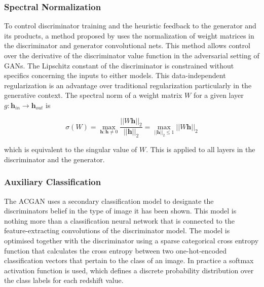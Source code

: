 \documentclass[twocolumn]{article}
\numberwithin{equation}{section}
\begin{document}
\subsubsection{Spectral Normalization}
To control discriminator training and the heuristic feedback to the generator and its products, a method proposed by 
\cite{spectral_norm} uses the normalization of weight matrices in the discriminator and generator convolutional nets. This 
method allows control over the derivative of the discriminator value function in the adversarial setting of GANs. The 
Lipschitz constant of the discriminator is constrained without specifics concerning the inputs to either models. This 
data-independent regularization is an advantage over traditional regularization particularly in the generative context. 
The spectral norm of a weight matrix $W$ for a given layer $g : \mathbf{h}_{in} \rightarrow \mathbf{h}_{out}$ is

\begin{equation}
    \sigma(W) = \max_{\mathbf{h}:\mathbf{h}\neq 0} \frac{|| W \mathbf{h}||_2}{||\mathbf{h}||_2}
              = \max_{||\mathbf{h}||_2 \leq 1} ||W\mathbf{h}||_2
\end{equation}

which is equivalent to the singular value of $W$. This is applied to all layers in the discriminator and the generator.


\subsubsection{Auxiliary Classification}
The ACGAN uses a secondary classification model to designate the discriminators belief in the type of image it has been 
shown. This model is nothing more than a classification neural network that is connected to the feature-extracting 
convolutions of the discriminator model. The model is optimised together with the discriminator using a sparse categorical
cross entropy function that calculates the cross entropy between two one-hot-encoded classification vectors that pertain 
to the class of an image. In practice a softmax activation function is used, which defines a discrete probability 
distribution over the class labels for each redshift value. 
\end{document}
